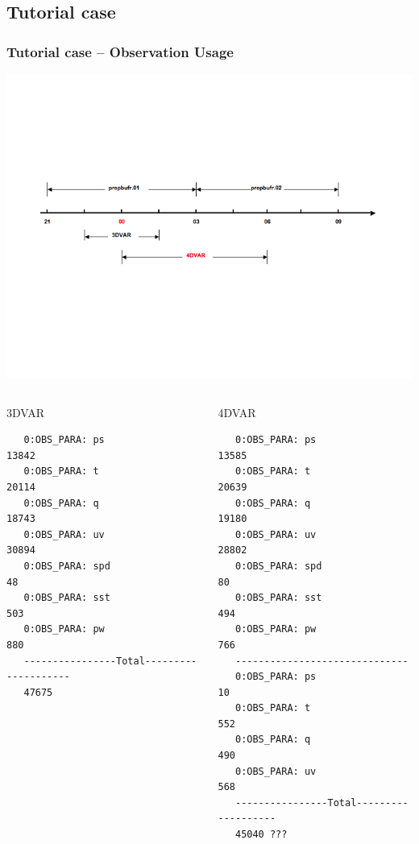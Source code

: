 \documentclass[10pt]{beamer}
\begin{document}
\subsection{Tutorial case}

\begin{frame}[fragile]
\frametitle{Tutorial case -- Observation Usage}
\begin{center}
\includegraphics[scale=0.40, trim=25 200 50 150, clip]{obs_usage} 
\end{center}\pause
\begin{columns}[c]
\column{5cm}
\begin{beamerboxesrounded}[ lower=postit,shadow=true]{3DVAR}
{\tiny
\begin{verbatim}
   0:OBS_PARA: ps                       13842
   0:OBS_PARA: t                        20114
   0:OBS_PARA: q                        18743
   0:OBS_PARA: uv                       30894
   0:OBS_PARA: spd                         48
   0:OBS_PARA: sst                        503
   0:OBS_PARA: pw                         880
   ----------------Total--------------------
   47675
\end{verbatim}
}
\end{beamerboxesrounded}
\column{5cm}
\begin{beamerboxesrounded}[ lower=postit,shadow=true]{4DVAR}
{\tiny
\begin{verbatim}
   0:OBS_PARA: ps                       13585
   0:OBS_PARA: t                        20639
   0:OBS_PARA: q                        19180
   0:OBS_PARA: uv                       28802
   0:OBS_PARA: spd                         80
   0:OBS_PARA: sst                        494
   0:OBS_PARA: pw                         766
   ------------------------------
   0:OBS_PARA: ps                          10
   0:OBS_PARA: t                          552
   0:OBS_PARA: q                          490
   0:OBS_PARA: uv                         568
   ----------------Total-------------------
   45040 ???
\end{verbatim}
}
\end{beamerboxesrounded}
\end{columns}
\end{frame}
\end{document}

